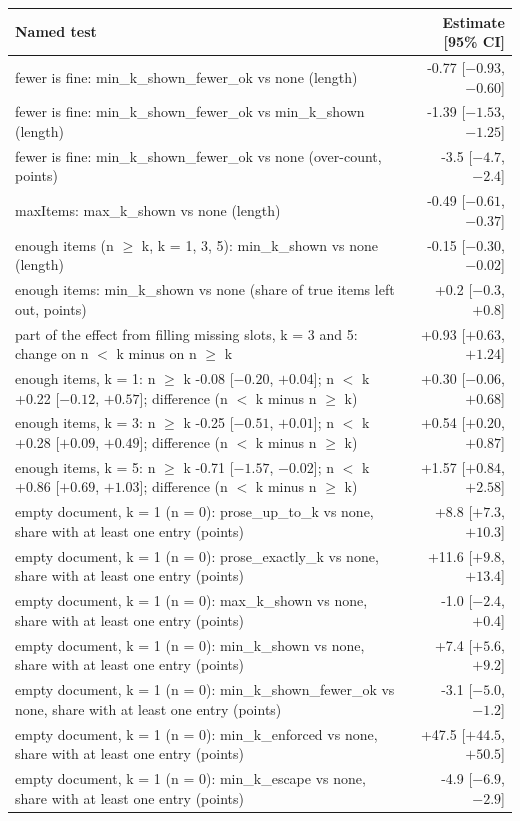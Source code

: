 \begin{tabular}{lr}
  \toprule
  Named test & Estimate [95\% CI] \\
  \midrule
  fewer is fine: min\_k\_shown\_fewer\_ok vs none (length) & -0.77 [$-0.93$, $-0.60$] \\
  fewer is fine: min\_k\_shown\_fewer\_ok vs min\_k\_shown (length) & -1.39 [$-1.53$, $-1.25$] \\
  fewer is fine: min\_k\_shown\_fewer\_ok vs none (over-count, points) & -3.5 [$-4.7$, $-2.4$] \\
  maxItems: max\_k\_shown vs none (length) & -0.49 [$-0.61$, $-0.37$] \\
  enough items (n $\geq$ k, k = 1, 3, 5): min\_k\_shown vs none (length) & -0.15 [$-0.30$, $-0.02$] \\
  enough items: min\_k\_shown vs none (share of true items left out, points) & +0.2 [$-0.3$, $+0.8$] \\
  part of the effect from filling missing slots, k = 3 and 5: change on n $<$ k minus on n $\geq$ k & +0.93 [$+0.63$, $+1.24$] \\
  enough items, k = 1: n $\geq$ k -0.08 [$-0.20$, $+0.04$]; n $<$ k +0.22 [$-0.12$, $+0.57$]; difference (n $<$ k minus n $\geq$ k) & +0.30 [$-0.06$, $+0.68$] \\
  enough items, k = 3: n $\geq$ k -0.25 [$-0.51$, $+0.01$]; n $<$ k +0.28 [$+0.09$, $+0.49$]; difference (n $<$ k minus n $\geq$ k) & +0.54 [$+0.20$, $+0.87$] \\
  enough items, k = 5: n $\geq$ k -0.71 [$-1.57$, $-0.02$]; n $<$ k +0.86 [$+0.69$, $+1.03$]; difference (n $<$ k minus n $\geq$ k) & +1.57 [$+0.84$, $+2.58$] \\
  empty document, k = 1 (n = 0): prose\_up\_to\_k vs none, share with at least one entry (points) & +8.8 [$+7.3$, $+10.3$] \\
  empty document, k = 1 (n = 0): prose\_exactly\_k vs none, share with at least one entry (points) & +11.6 [$+9.8$, $+13.4$] \\
  empty document, k = 1 (n = 0): max\_k\_shown vs none, share with at least one entry (points) & -1.0 [$-2.4$, $+0.4$] \\
  empty document, k = 1 (n = 0): min\_k\_shown vs none, share with at least one entry (points) & +7.4 [$+5.6$, $+9.2$] \\
  empty document, k = 1 (n = 0): min\_k\_shown\_fewer\_ok vs none, share with at least one entry (points) & -3.1 [$-5.0$, $-1.2$] \\
  empty document, k = 1 (n = 0): min\_k\_enforced vs none, share with at least one entry (points) & +47.5 [$+44.5$, $+50.5$] \\
  empty document, k = 1 (n = 0): min\_k\_escape vs none, share with at least one entry (points) & -4.9 [$-6.9$, $-2.9$] \\
  \bottomrule
\end{tabular}
